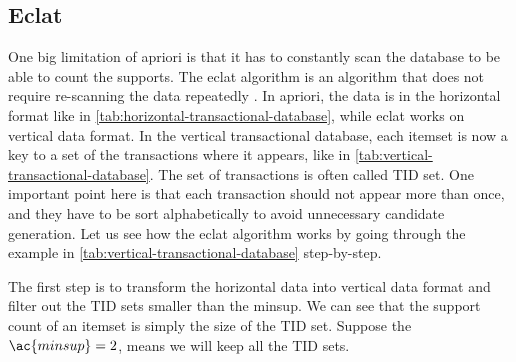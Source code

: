 



\subsection{Eclat}
One big limitation of \acl*{apriori} is that it has to constantly scan the database to be able to count the supports.
The \ac{eclat} algorithm is an algorithm that does not require re-scanning the data repeatedly \citep{zaki1997}.
In \acl{apriori}, the data is in the horizontal format like in \autoref{tab:horizontal-transactional-database}, while \ac{eclat} works on vertical data format.
In the vertical transactional database, each itemset is now a key to a set of the transactions where it appears, like in \autoref{tab:vertical-transactional-database}.
The set of transactions is often called \ac{TID} set.
One important point here is that each transaction should not appear more than once, and they have to be sort alphabetically to avoid unnecessary candidate generation.
Let us see how the \ac{eclat} algorithm works by going through the example in \autoref{tab:vertical-transactional-database} step-by-step.

The first step is to transform the horizontal data into vertical data format and filter out the \ac{TID} sets smaller than the \ac{minsup}.
We can see that the support count of an itemset is simply the size of the \ac{TID} set.
Suppose the $\ac{minsup}=2$, means we will keep all the \ac{TID} sets.

